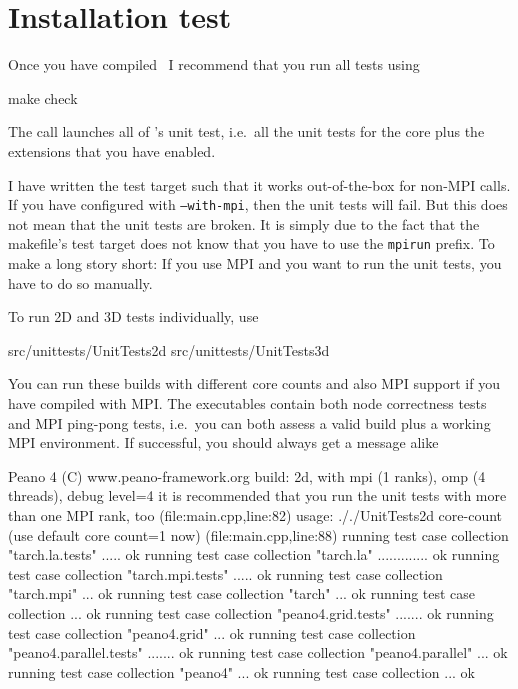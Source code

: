 \section{Installation test}

Once you have compiled \Peano\, I recommend that you run all tests using

\begin{code}
  make check
\end{code}

\noindent
The call launches all of \Peano's unit test, i.e.~all the unit tests for the
core plus the extensions that you have enabled.


\begin{remark}
 I have written the test target such that it works out-of-the-box for non-MPI
 calls. If you have configured with \texttt{--with-mpi}, then the unit tests
 will fail. But this does not mean that the unit tests are broken. It is simply
 due to the fact that the makefile's test target does not know that you have to
 use the \texttt{mpirun} prefix.
 To make a long story short: If you use MPI and you want to run the unit tests,
 you have to do so manually.
\end{remark}


\noindent
To run 2D and 3D tests individually, use

\begin{code}
  src/unittests/UnitTests2d
  src/unittests/UnitTests3d
\end{code}

\noindent
You can run these builds with different core counts and also MPI support if you
have compiled with MPI.
The executables contain both node correctness tests and MPI ping-pong tests,
i.e.~you can both assess a valid build plus a working MPI environment.
If successful, you should always get a message alike

\begin{code}
Peano 4 (C) www.peano-framework.org 
build: 2d, with mpi (1 ranks), omp (4 threads), debug level=4
it is recommended that you run the unit tests with more than one MPI rank, too (file:main.cpp,line:82)
usage: ././UnitTests2d core-count (use default core count=1 now) (file:main.cpp,line:88)
running test case collection "tarch.la.tests" ..... ok
running test case collection "tarch.la" ............. ok
running test case collection "tarch.mpi.tests" ..... ok
running test case collection "tarch.mpi" ... ok
running test case collection "tarch" ... ok
running test case collection ... ok
running test case collection "peano4.grid.tests" ....... ok
running test case collection "peano4.grid" ... ok
running test case collection "peano4.parallel.tests" ....... ok
running test case collection "peano4.parallel" ... ok
running test case collection "peano4" ... ok
running test case collection ... ok
\end{code}

